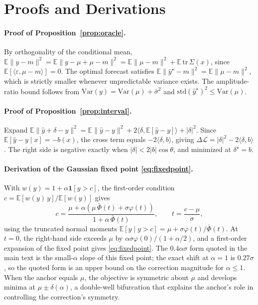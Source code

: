\section{Proofs and Derivations}
\label{app:proofs}

\paragraph{Proof of Proposition~\ref{prop:oracle}.}
By orthogonality of the conditional mean, $\mathbb{E}\|y - m\|^2 = \mathbb{E}\|y - \mu + \mu - m\|^2 = \mathbb{E}\|\mu - m\|^2 + \mathbb{E}\,\mathrm{tr}\,\Sigma(x)$, since $\mathbb{E}[\langle \varepsilon, \mu - m \rangle] = 0$. The optimal forecast satisfies $\mathbb{E}\|\hat{y}^\star - m\|^2 = \mathbb{E}\|\mu - m\|^2$, which is strictly smaller whenever unpredictable variance exists. The amplitude-ratio bound follows from $\mathrm{Var}(y) = \mathrm{Var}(\mu) + \bar{\sigma}^2$ and $\mathrm{std}(\hat{y}^\star)^2 \le \mathrm{Var}(\mu)$.

\paragraph{Proof of Proposition~\ref{prop:interval}.}
Expand $\mathbb{E}\|\hat{y} + \delta - y\|^2 = \mathbb{E}\|\hat{y} - y\|^2 + 2\langle \delta, \mathbb{E}[\hat{y} - y] \rangle + |\delta|^2$. Since $\mathbb{E}[\hat{y} - y \mid x] = -b(x)$, the cross term equals $-2\langle \delta, b\rangle$, giving $\Delta\mathcal{L} = |\delta|^2 - 2\langle\delta, b\rangle$. The right side is negative exactly when $|\delta| < 2|b|\cos\theta$, and minimized at $\delta^\star = b$.

\paragraph{Derivation of the Gaussian fixed point \eqref{eq:fixedpoint}.}
With $w(y) = 1 + \alpha\mathbf{1}[y > c]$, the first-order condition $c = \mathbb{E}[w(y)\,y] / \mathbb{E}[w(y)]$ gives
\begin{equation}
    c = \frac{\mu + \alpha\left(\mu\,\bar{\Phi}(t) + \sigma\varphi(t)\right)}{1 + \alpha\,\bar{\Phi}(t)},
    \qquad t = \frac{c - \mu}{\sigma},
\end{equation}
using the truncated normal moments $\mathbb{E}[y \mid y > c] = \mu + \sigma\varphi(t)/\bar{\Phi}(t)$. At $t = 0$, the right-hand side exceeds $\mu$ by $\alpha\sigma\varphi(0)/(1 + \alpha/2)$, and a first-order expansion of the fixed point gives \eqref{eq:fixedpoint}. The $0.4\alpha\sigma$ form quoted in the main text is the small-$\alpha$ slope of this fixed point; the exact shift at $\alpha = 1$ is $0.27\sigma$, so the quoted form is an upper bound on the correction magnitude for $\alpha \le 1$. When the anchor equals $\mu$, the objective is symmetric about $\mu$ and develops minima at $\mu \pm \delta(\alpha)$, a double-well bifurcation that explains the anchor's role in controlling the correction's symmetry.

